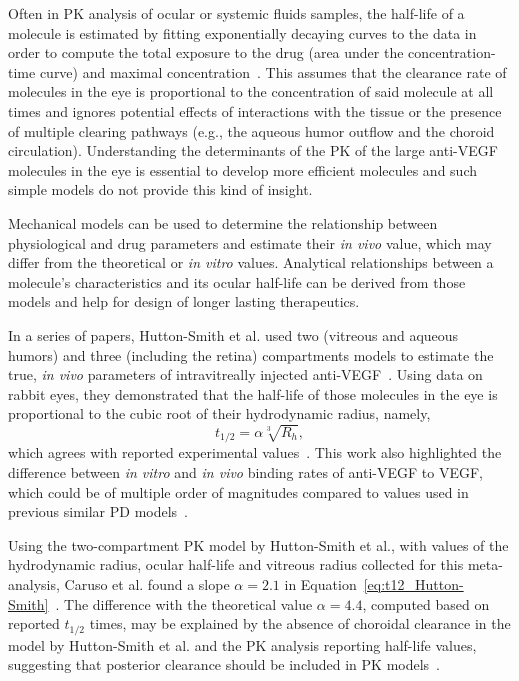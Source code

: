 \documentclass[12pt,a4paper]{journal}
\begin{document}
Often in PK analysis of ocular or systemic fluids samples, the half-life of a molecule is estimated by fitting exponentially decaying curves to the data in order to compute the total exposure to the drug (area under the concentration-time curve) and maximal concentration~\cite{Bakri_2007, Kaiser_2019, Park_2015, Park_2016, Xu_2013}.
This assumes that the clearance rate of molecules in the eye is proportional to the concentration of said molecule at all times and ignores potential effects of interactions with the tissue or the presence of multiple clearing pathways (e.g., the aqueous humor outflow and the choroid circulation).
Understanding the determinants of the PK of the large anti-VEGF molecules in the eye is essential to develop more efficient molecules and such simple models do not provide this kind of insight.

Mechanical models can be used to determine the relationship between physiological and drug parameters and estimate their \textit{in vivo} value, which may differ from the theoretical or \textit{in vitro} values.
Analytical relationships between a molecule's characteristics and its ocular half-life can be derived from those models and help for design of longer lasting therapeutics.

In a series of papers, Hutton-Smith et al. used two (vitreous and aqueous humors) and three (including the retina) compartments models to estimate the true, \textit{in vivo} parameters of intravitreally injected anti-VEGF~\cite{HuttonSmith_2016,HuttonSmith_2017,HuttonSmith_2018}.
Using data on rabbit eyes, they demonstrated that the half-life of those molecules in the eye is proportional to the cubic root of their hydrodynamic radius, namely,
\begin{equation}
  \label{eq:t12_Hutton-Smith}
  t_{1/2} = \alpha\sqrt[3]{R_h},
\end{equation}
which agrees with reported experimental values~\cite{HuttonSmith_2016}.
This work also highlighted the difference between \textit{in vitro} and \textit{in vivo} binding rates of anti-VEGF to VEGF, which could be of multiple order of magnitudes compared to values used in previous similar PD models~\cite{Saunders_2015}.

Using the two-compartment PK model by Hutton-Smith et al., with values of the hydrodynamic radius, ocular half-life and vitreous radius collected for this meta-analysis, Caruso et al. found a slope $\alpha=2.1$ in Equation~\ref{eq:t12_Hutton-Smith}~\cite{Caruso_2020}.
The difference with the theoretical value $\alpha=4.4$, computed based on reported $t_{1/2}$ times, may be explained by the absence of choroidal clearance in the model by Hutton-Smith et al. and the PK analysis reporting half-life values, suggesting that posterior clearance should be included in PK models~\cite{HuttonSmith_2016}.
\end{document}

